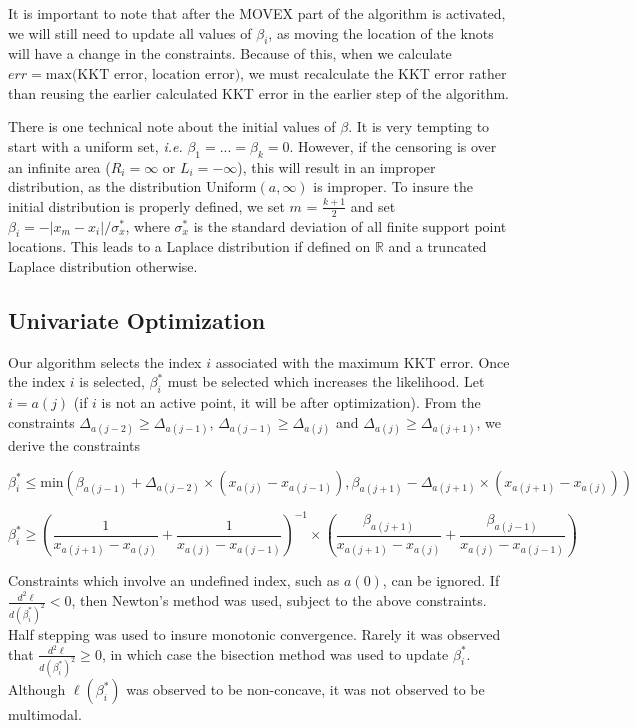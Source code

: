 \documentclass[10pt]{article}
\begin{document}
	It is important to note that after the MOVEX part of the algorithm is activated, we will still need to update all values of $\beta_i$, as moving the location of the knots will have a change in the constraints. Because of this, when we calculate $err = \text{max(KKT error, location error)}$, we must recalculate the KKT error rather than reusing the earlier calculated KKT error in the earlier step of the algorithm. 
	
	There is one technical note about the initial values of $\beta$. It is very tempting to start with a uniform set, \emph{i.e.} $\beta_1 = ... = \beta_k = 0$. However, if the censoring is over an infinite area ($R_i = \infty$ or $L_i = -\infty$), this will result in an improper distribution, as the distribution Uniform$(a, \infty)$ is improper. To insure the initial distribution is properly defined, we set $m$ = $\frac{k + 1} {2}$ and set $\beta_i = -|x_m - x_i | / \sigma_x^*$, where $\sigma_x^*$ is the standard deviation of all finite support point locations. This leads to a Laplace distribution if defined on $\mathbb{R}$ and a truncated Laplace distribution otherwise.	
	{\subsection{Univariate Optimization}} 
	
	Our algorithm selects the index $i$ associated with the maximum KKT error. Once the index $i$ is selected, $\beta_i^*$ must be selected which increases the likelihood. Let $i = a(j)$ (if $i$ is not an active point, it will be after optimization). From the constraints $\Delta_{a(j-2)} \geq \Delta_{a(j-1)}$, $\Delta_{a(j-1)} \geq \Delta_{a(j)}$ and $\Delta_{a(j)} \geq \Delta_{a(j+1)}$, we derive the constraints
	
	\[ \beta_i^* \leq \text{min}\left(\beta_{a(j-1)} + \Delta_{a(j-2)} \times (x_{a(j)} - x_{a(j-1)}), \beta_{a(j+1)} -\Delta_{a(j+1)} \times (x_{a(j+1)} - x_{a(j)}) \right) 
	\]
	
	\[ \beta_i^* \geq \left(\frac{1}{x_{a(j+1)} - x_{a(j)}} +  \frac{1}{x_{a(j)} - x_{a(j-1)} } \right)^{-1} \times \left(\frac{\beta_{a(j+1)} } { x_{a(j+1)} - x_{a(j)}} + \frac{\beta_{a(j-1)}} {x_{a(j)} - x_{a(j-1)} } \right)
	\]
	
	Constraints which involve an undefined index, such as $a(0)$, can be ignored. If $\frac{d^2 \ell} {d (\beta^*_{i})^2 } < 0$, then Newton's method was used, subject to the above constraints. Half stepping was used to insure monotonic convergence. Rarely it was observed that $\frac{d^2 \ell} {d (\beta^*_{i}) ^2 } \geq 0$, in which case the bisection method was used to update $\beta^*_i$. Although $\ell(\beta^*_i)$ was observed to be non-concave, it was not observed to be multimodal.
	
\end{document}
